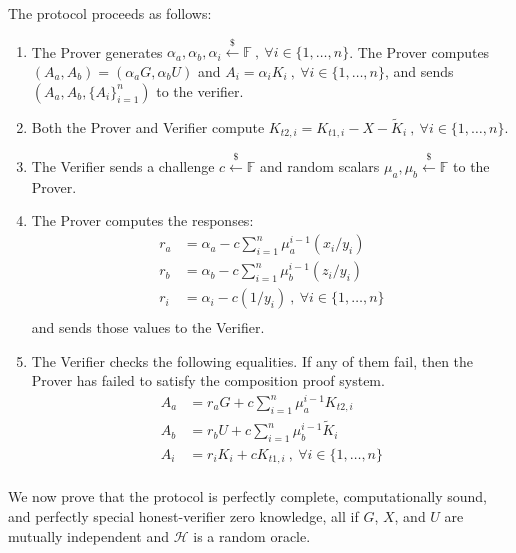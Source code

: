 \documentclass{article}
\begin{document}
The protocol proceeds as follows:
\begin{enumerate}
\item The Prover generates $\alpha_a, \alpha_b, \alpha_i \xleftarrow{\$}\mathbb{F}\ ,\ \forall i\in\{1,\ldots,n\}$. The Prover computes $(A_a, A_b) = (\alpha_a G, \alpha_b U)$ and $A_{i}=\alpha_i K_i\ ,\ \forall i\in\{1,\ldots,n\}$, and sends $(A_a, A_b, \{A_i\}_{i=1}^n)$ to the verifier.
\item Both the Prover and Verifier compute $K_{t2,i} = K_{t1,i} - X - \tilde{K}_i\ ,\ \forall i\in\{1,\ldots,n\}$.
\item The Verifier sends a challenge $c\xleftarrow{\$}\mathbb{F}$ and random scalars $\mu_a,\mu_b\xleftarrow{\$}\mathbb{F}$ to the Prover.
\item The Prover computes the responses:
\begin{align*}
r_{a} &= \alpha_a - c \sum_{i=1}^{n}{\mu_a^{i-1} (x_i/y_i)} \\
r_{b} &= \alpha_b - c \sum_{i=1}^{n}{\mu_b^{i-1}(z_i/y_i)} \\
r_{i} &= \alpha_i - c (1/y_i)\ ,\ \forall i\in\{1,\ldots,n\}\\
\end{align*}
and sends those values to the Verifier.
\item The Verifier checks the following equalities. If any of them fail, then the Prover has failed to satisfy the composition proof system.
\begin{align*}
A_{a} &= r_a G + c \sum_{i=1}^{n}{\mu_a^{i-1} K_{t2,i}} \\
A_{b} &= r_b U + c \sum_{i=1}^{n}{\mu_b^{i-1} \tilde{K}_i} \\
A_{i} &= r_i K_i + c K_{t1,i}\ ,\ \forall i\in\{1,\ldots,n\}\\
\end{align*}
\end{enumerate}
We now prove that the protocol is perfectly complete, computationally sound, and perfectly special honest-verifier zero knowledge, all if $G$, $X$, and $U$ are mutually independent and $\mathcal{H}$ is a random oracle.
\end{document}

